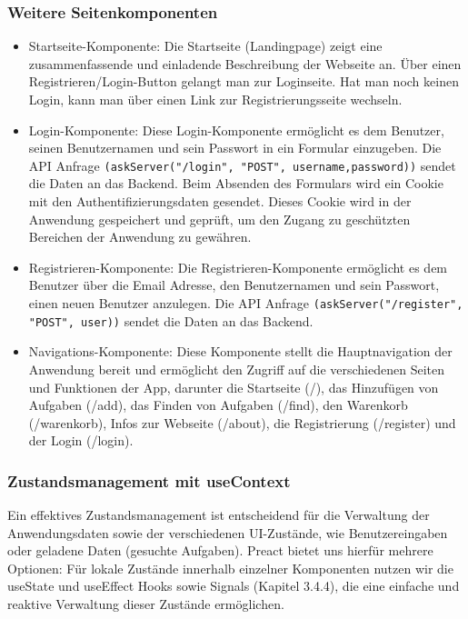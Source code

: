 \subsubsection{Weitere Seitenkomponenten}

\begin{itemize}
\item Startseite-Komponente:
 Die Startseite (Landingpage) zeigt eine zusammenfassende und einladende Beschreibung der Webseite an. Über einen Registrieren/Login-Button gelangt man zur Loginseite. Hat man noch keinen Login, kann man über einen Link zur Registrierungsseite wechseln.

\item Login-Komponente:
Diese Login-Komponente ermöglicht es dem Benutzer, seinen Benutzernamen und sein Passwort in ein Formular einzugeben. Die API Anfrage \texttt{(askServer("/login", "POST", {username,password}))} sendet die Daten an das Backend.
Beim Absenden des Formulars wird ein Cookie mit den Authentifizierungsdaten gesendet. Dieses Cookie wird in der Anwendung gespeichert und geprüft, um den Zugang zu geschützten Bereichen der Anwendung zu gewähren.


\item Registrieren-Komponente:
Die Registrieren-Komponente ermöglicht es dem Benutzer über die Email Adresse, den Benutzernamen und sein Passwort, einen neuen Benutzer anzulegen. Die API Anfrage \texttt{(askServer("/register", "POST", user))} sendet die Daten an das Backend.

\item Navigations-Komponente:
Diese Komponente stellt die Hauptnavigation der Anwendung bereit und ermöglicht den Zugriff auf die verschiedenen Seiten und Funktionen der App, darunter die Startseite (/), das Hinzufügen von Aufgaben (/add), das Finden von Aufgaben (/find), den Warenkorb (/warenkorb), Infos zur Webseite (/about), die Registrierung (/register) und der Login (/login).


\end{itemize}



\subsubsection{Zustandsmanagement mit useContext } 

Ein effektives Zustandsmanagement ist entscheidend für die Verwaltung der Anwendungsdaten sowie der verschiedenen UI-Zustände, wie Benutzereingaben oder geladene Daten (gesuchte Aufgaben). Preact bietet uns hierfür mehrere Optionen: Für lokale Zustände innerhalb einzelner Komponenten nutzen wir die useState und useEffect Hooks sowie Signals (Kapitel 3.4.4), die eine einfache und reaktive Verwaltung dieser Zustände ermöglichen. 

